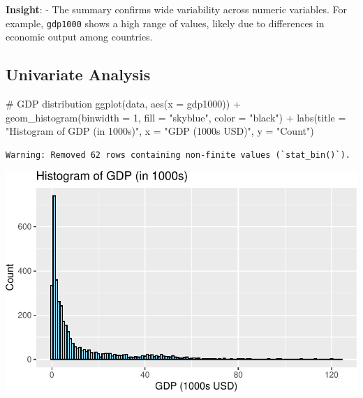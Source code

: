 \documentclass[
  letterpaper,
  DIV=11,
  numbers=noendperiod]{scrartcl}
\newenvironment{Shaded}{\begin{snugshade}}{\end{snugshade}}
\newcommand{\AttributeTok}[1]{\textcolor[rgb]{0.40,0.45,0.13}{#1}}
\newcommand{\CommentTok}[1]{\textcolor[rgb]{0.37,0.37,0.37}{#1}}
\newcommand{\DecValTok}[1]{\textcolor[rgb]{0.68,0.00,0.00}{#1}}
\newcommand{\FunctionTok}[1]{\textcolor[rgb]{0.28,0.35,0.67}{#1}}
\newcommand{\NormalTok}[1]{\textcolor[rgb]{0.00,0.23,0.31}{#1}}
\newcommand{\SpecialCharTok}[1]{\textcolor[rgb]{0.37,0.37,0.37}{#1}}
\newcommand{\StringTok}[1]{\textcolor[rgb]{0.13,0.47,0.30}{#1}}
\begin{document}
\textbf{Insight}: - The summary confirms wide variability across numeric
variables. For example, \texttt{gdp1000} shows a high range of values,
likely due to differences in economic output among countries.

\subsection{Univariate Analysis}\label{univariate-analysis}

\begin{Shaded}
\begin{Highlighting}[]
\CommentTok{\# GDP distribution}
\FunctionTok{ggplot}\NormalTok{(data, }\FunctionTok{aes}\NormalTok{(}\AttributeTok{x =}\NormalTok{ gdp1000)) }\SpecialCharTok{+} 
  \FunctionTok{geom\_histogram}\NormalTok{(}\AttributeTok{binwidth =} \DecValTok{1}\NormalTok{, }\AttributeTok{fill =} \StringTok{"skyblue"}\NormalTok{, }\AttributeTok{color =} \StringTok{"black"}\NormalTok{) }\SpecialCharTok{+}
  \FunctionTok{labs}\NormalTok{(}\AttributeTok{title =} \StringTok{"Histogram of GDP (in 1000s)"}\NormalTok{, }\AttributeTok{x =} \StringTok{"GDP (1000s USD)"}\NormalTok{, }\AttributeTok{y =} \StringTok{"Count"}\NormalTok{)}
\end{Highlighting}
\end{Shaded}

\begin{verbatim}
Warning: Removed 62 rows containing non-finite values (`stat_bin()`).
\end{verbatim}

\includegraphics{EDA_files/figure-pdf/unnamed-chunk-4-1.pdf}
\end{document}
